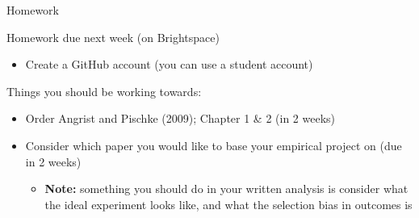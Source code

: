 \documentclass[handout, 8pt]{beamer}
\begin{document}
\begin{frame}{Homework}

Homework due next week (on Brightspace)
\begin{itemize}
    \item Create a GitHub account (you can use a student account)
\end{itemize}

Things you should be working towards:
\begin{itemize}
    \item Order Angrist and Pischke (2009); Chapter 1 \& 2 (in 2 weeks)
    \item Consider which paper you would like to base your empirical project on (due in 2 weeks)
    \begin{itemize}
        \item \textbf{Note:} something you should do in your written analysis is consider what the ideal experiment looks like, and what the selection bias in outcomes is
    \end{itemize}
    
\end{itemize}

\end{frame}






% 


% 
\end{document}
